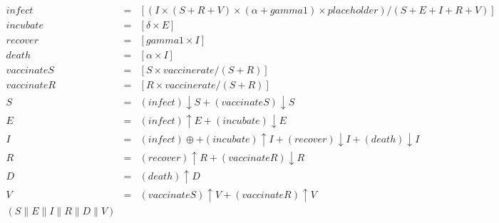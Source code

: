 \begin{eqnarray*}
\mathit{infect} & = & [(I\times (S+R+V)\times (\alpha+\mathit{gamma1})\times \mathit{placeholder})/(S+E+I+R+V)]\\%
\mathit{incubate} & = & [\delta\times E]\\%
\mathit{recover} & = & [\mathit{gamma1}\times I]\\%
\mathit{death} & = & [\alpha\times I]\\%
\mathit{vaccinateS} & = & [S\times \mathit{vaccinerate}/(S+R)]\\%
\mathit{vaccinateR} & = & [R\times \mathit{vaccinerate}/(S+R)]\\%
%
S & = & (\mathit{infect}){\downarrow}S + (\mathit{vaccinateS}){\downarrow}S\\%
E & = & (\mathit{infect}){\uparrow}E + (\mathit{incubate}){\downarrow}E\\%
I & = & (\mathit{infect})\oplus  + (\mathit{incubate}){\uparrow}I + (\mathit{recover}){\downarrow}I + (\mathit{death}){\downarrow}I\\%
R & = & (\mathit{recover}){\uparrow}R + (\mathit{vaccinateR}){\downarrow}R\\%
D & = & (\mathit{death}){\uparrow}D\\%
V & = & (\mathit{vaccinateS}){\uparrow}V + (\mathit{vaccinateR}){\uparrow}V\\%
%
(S {\parallel} E {\parallel} I {\parallel} R {\parallel} D {\parallel} V)\end{eqnarray*}

